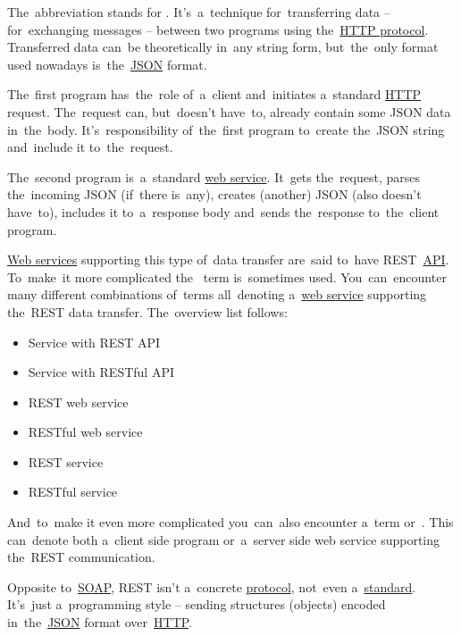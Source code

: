 \label{rest}
The~abbreviation stands for .
It's~a~technique for~transferring data -- for~exchanging messages -- between two programs using the~\hyperref[http]{HTTP protocol}.
Transferred data can~be theoretically in~any string form, but~the~only format used nowadays is~the~\hyperref[json]{JSON} format.

The~first program has~the~role of~a~client and~initiates a~standard \hyperref[http]{HTTP} request.
The~request can, but~doesn't have~to, already contain some JSON data in~the~body.
It's~responsibility of~the~first program to~create the~JSON string and~include it to~the~request.

The~second program is~a~standard \hyperref[webserviceapplication]{web service}.
It~gets the~request, parses the~incoming JSON (if~there is~any), creates (another) JSON (also doesn't have~to), includes it to~a~response body and~sends the~response to~the~client program.

\hyperref[webserviceapplication]{Web services} supporting this type of~data transfer are~said to~have \mbox{REST \hyperref[api]{API}}.
To~make~it more complicated the~ term is~sometimes used.
You~can~encounter many different combinations of~terms all~denoting a~\hyperref[webserviceapplication]{web service} supporting the~REST data transfer.
The~overview list follows:
\begin{itemize}
    \item Service with REST API
    \item Service with RESTful API
    \item REST web service
    \item RESTful web service
    \item REST service
    \item RESTful service
\end{itemize}

\noindent And~to~make it even more complicated you~can~also encounter a~term  or~.
This can~denote both a~client side program or~a~server side web service supporting the~REST communication.

\warning Opposite to~\hyperref[soap]{SOAP}, REST isn't a~concrete \hyperref[protocolstandard]{protocol}, not~even a~\hyperref[protocolstandard]{standard}.
It's~just a~programming style -- sending structures (objects) encoded in~the~\hyperref[json]{JSON} format over~\hyperref[http]{HTTP}.
